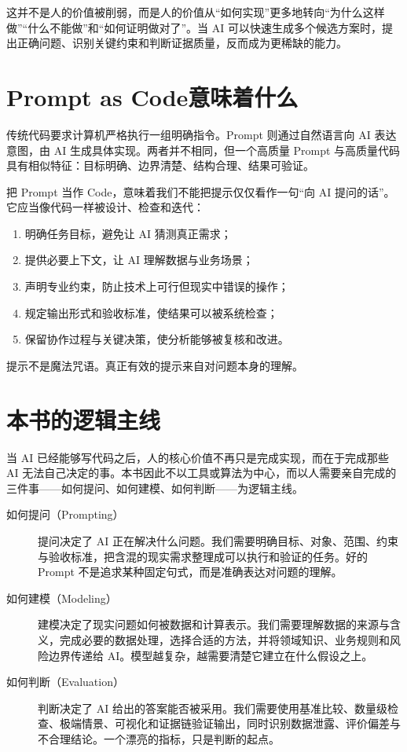 这并不是人的价值被削弱，而是人的价值从“如何实现”更多地转向“为什么这样做”“什么不能做”和“如何证明做对了”。当 AI 可以快速生成多个候选方案时，提出正确问题、识别关键约束和判断证据质量，反而成为更稀缺的能力。

\section*{Prompt as Code意味着什么}

传统代码要求计算机严格执行一组明确指令。Prompt 则通过自然语言向 AI 表达意图，由 AI 生成具体实现。两者并不相同，但一个高质量 Prompt 与高质量代码具有相似特征：目标明确、边界清楚、结构合理、结果可验证。

把 Prompt 当作 Code，意味着我们不能把提示仅仅看作一句“向 AI 提问的话”。它应当像代码一样被设计、检查和迭代：

\begin{enumerate}
  \item 明确任务目标，避免让 AI 猜测真正需求；
  \item 提供必要上下文，让 AI 理解数据与业务场景；
  \item 声明专业约束，防止技术上可行但现实中错误的操作；
  \item 规定输出形式和验收标准，使结果可以被系统检查；
  \item 保留协作过程与关键决策，使分析能够被复核和改进。
\end{enumerate}

提示不是魔法咒语。真正有效的提示来自对问题本身的理解。

\section*{本书的逻辑主线}

当 AI 已经能够写代码之后，人的核心价值不再只是完成实现，而在于完成那些 AI 无法自己决定的事。本书因此不以工具或算法为中心，而以人需要亲自完成的三件事——如何提问、如何建模、如何判断——为逻辑主线。

\begin{description}
  \item[如何提问（Prompting）] 提问决定了 AI 正在解决什么问题。我们需要明确目标、对象、范围、约束与验收标准，把含混的现实需求整理成可以执行和验证的任务。好的 Prompt 不是追求某种固定句式，而是准确表达对问题的理解。
  \item[如何建模（Modeling）] 建模决定了现实问题如何被数据和计算表示。我们需要理解数据的来源与含义，完成必要的数据处理，选择合适的方法，并将领域知识、业务规则和风险边界传递给 AI。模型越复杂，越需要清楚它建立在什么假设之上。
  \item[如何判断（Evaluation）] 判断决定了 AI 给出的答案能否被采用。我们需要使用基准比较、数量级检查、极端情景、可视化和证据链验证输出，同时识别数据泄露、评价偏差与不合理结论。一个漂亮的指标，只是判断的起点。
\end{description}

